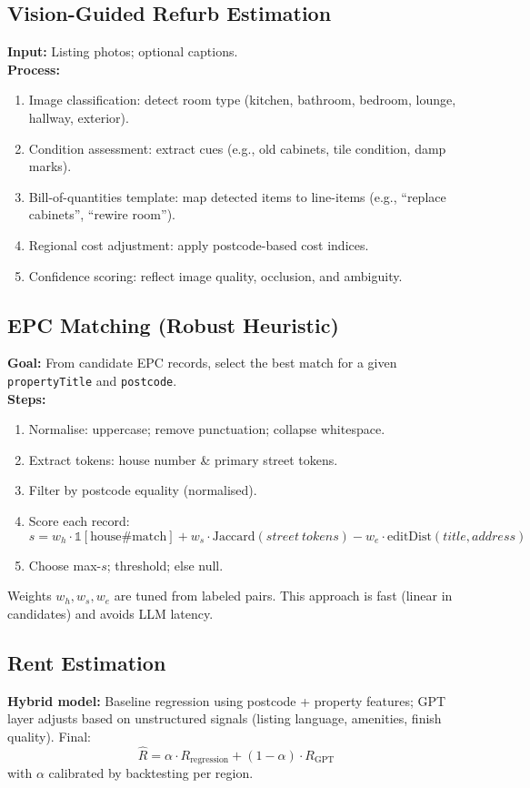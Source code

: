 \documentclass[12pt,a4paper]{article}
\begin{document}
\subsection{Vision-Guided Refurb Estimation}
\textbf{Input:} Listing photos; optional captions. \\
\textbf{Process:}
\begin{enumerate}[leftmargin=1.5em]
  \item Image classification: detect room type (kitchen, bathroom, bedroom, lounge, hallway, exterior).
  \item Condition assessment: extract cues (e.g., old cabinets, tile condition, damp marks).
  \item Bill-of-quantities template: map detected items to line-items (e.g., “replace cabinets”, “rewire room”).
  \item Regional cost adjustment: apply postcode-based cost indices.
  \item Confidence scoring: reflect image quality, occlusion, and ambiguity.
\end{enumerate}

\subsection{EPC Matching (Robust Heuristic)}
\textbf{Goal:} From candidate EPC records, select the best match for a given \texttt{propertyTitle} and \texttt{postcode}. \\
\textbf{Steps:}
\begin{enumerate}[leftmargin=1.5em]
  \item Normalise: uppercase; remove punctuation; collapse whitespace.
  \item Extract tokens: house number \& primary street tokens.
  \item Filter by postcode equality (normalised).
  \item Score each record: 
  \[
    s = w_h \cdot \mathbb{1}[\text{house\# match}] + w_s \cdot \text{Jaccard}(street~tokens) - w_e \cdot \text{editDist}(title, address)
  \]
  \item Choose max-$s$; threshold; else null.
\end{enumerate}
Weights $w_h, w_s, w_e$ are tuned from labeled pairs. This approach is fast (linear in candidates) and avoids LLM latency.

\subsection{Rent Estimation}
\textbf{Hybrid model:} Baseline regression using postcode + property features; GPT layer adjusts based on unstructured signals (listing language, amenities, finish quality). Final:
\[
\hat{R} = \alpha \cdot R_{\text{regression}} + (1-\alpha)\cdot R_{\text{GPT}}
\]
with $\alpha$ calibrated by backtesting per region.
\end{document}
